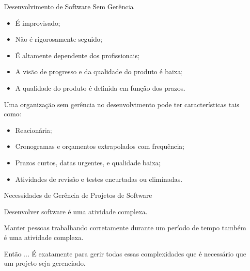 \documentclass[xcolor=x11names,compress]{beamer}
\begin{document}
\begin{frame}[allowframebreaks=.8]{Desenvolvimento de Software Sem Gerência}

\begin{itemize}
\itemsep 5mm

\item É improvisado;

\item Não é rigorosamente seguido;

\item É altamente dependente dos profissionais;

\item A visão de progresso e da qualidade do produto é baixa;

\item A qualidade do produto é definida em função dos prazos.

\end{itemize}

Uma organização sem gerência no desenvolvimento pode ter características tais como:

\begin{itemize}
\itemsep 5mm

\item Reacionária;

\item Cronogramas e orçamentos extrapolados com frequência;

\item Prazos curtos, datas urgentes, e qualidade baixa;

\item Atividades de revisão e testes encurtadas ou eliminadas.

\end{itemize}

\end{frame}

\begin{frame}{Necessidades de Gerência de Projetos de Software}

\begin{block}{}
Desenvolver software é uma atividade complexa.
\end{block}

\pause

\begin{block}{}
Manter pessoas trabalhando corretamente durante um período de tempo também é uma atividade complexa.
\end{block}

\pause

\begin{alertblock}{\centering Então ...}
É exatamente para gerir todas essas complexidades que é necessário que um projeto seja gerenciado.
\end{alertblock}

\end{frame}
\end{document}
